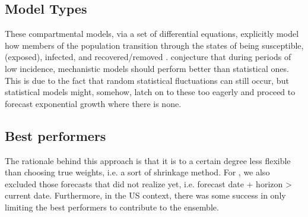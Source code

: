 \subsection{Model Types}
These compartmental models, via a set of differential equations, explicitly model how members of the population transition through the states of being susceptible, (exposed), infected, and recovered/removed \cite{taylor_combining_2021}.
\cite{taylor_combining_2021} conjecture that during periods of low incidence, mechanistic models should perform better than statistical ones. This is due to the fact that random statistical fluctuations can still occur, but statistical models might, somehow, latch on to these too eagerly and proceed to forecast exponential growth where there is none.
\subsection{Best performers}
The rationale behind this approach is that it is to a certain degree less flexible than choosing true weights, i.e. a sort of shrinkage method.
For , we also excluded those forecasts that did not realize yet, i.e. forecast date + horizon > current date.
Furthermore, in the US context, there was some success in only limiting the best performers to contribute to the ensemble.
